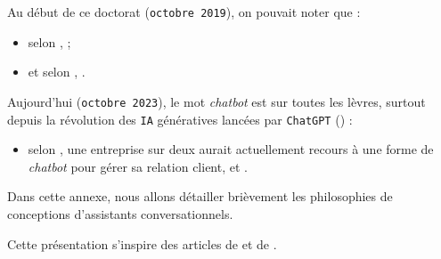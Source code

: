\label{annex:B-ANNEXE-CHATBOT}
	
	
	Au début de ce doctorat (\texttt{octobre 2019}), on pouvait noter que :
	\begin{itemize}
		\item selon \cite{costello-lodolce:2019:gartner-top-technologies},  ;
		\item et selon \cite{goasduff:2019:chatbots-will-appeal}, .
	\end{itemize}
	
	Aujourd'hui (\texttt{octobre 2023}), le mot \textit{chatbot} est sur toutes les lèvres, surtout depuis la révolution des \texttt{IA} génératives lancées par \texttt{ChatGPT} (\cite{openai:2023:chatgpt}) :
	\begin{itemize}
		\item selon \cite{costello-lodolce:2022:gartner-predicts-chatbots}, une entreprise sur deux aurait actuellement recours à une forme de \textit{chatbot} pour gérer sa relation client, et .
	\end{itemize}

	Dans cette annexe, nous allons détailler brièvement les philosophies de conceptions d'assistants conversationnels.
	
	\begin{leftBarInformation}
		Cette présentation s'inspire des articles de \cite{chen-etal:2017:survey-dialogue-systems} et de \cite{adamopoulou-moussiades:2020:overview-chatbot-technology}.
	\end{leftBarInformation}
	
	\minitoc
	
	
	
	
	
	
